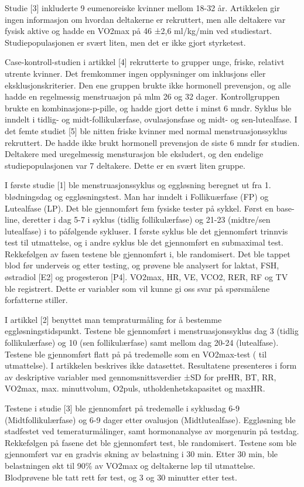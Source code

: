 \documentclass[
  letterpaper,
  DIV=11,
  numbers=noendperiod]{scrreprt}
\begin{document}
Studie {[}3{]} inkluderte 9 eumenoreiske kvinner mellom 18-32 år.
Artikkelen gir ingen informasjon om hvordan deltakerne er rekruttert,
men alle deltakere var fysisk aktive og hadde en VO2max på 46 ±2,6
ml/kg/min ved studiestart. Studiepopulasjonen er svært liten, men det er
ikke gjort styrketest.

Case-kontroll-studien i artikkel {[}4{]} rekrutterte to grupper unge,
friske, relativt utrente kvinner. Det fremkommer ingen opplysninger om
inklusjons eller eksklusjonskriterier. Den ene gruppen brukte ikke
hormonell prevensjon, og alle hadde en regelmessig menstruasjon på mlm
26 og 32 dager. Kontrollgruppen brukte en kombinasjons-p-pille, og hadde
gjort dette i minst 6 mndr. Syklus ble inndelt i tidlig- og
midt-follikulærfase, ovulasjonsfase og midt- og sen-lutealfase. I det
femte studiet {[}5{]} ble nitten friske kvinner med normal
menstruasjonssyklus rekruttert. De hadde ikke brukt hormonell prevensjon
de siste 6 mndr før studien. Deltakere med uregelmessig mensturasjon ble
eksludert, og den endelige studiepopulasjonen var 7 deltakere. Dette er
en svært liten gruppe.

I første studie {[}1{]} ble menstruasjonssyklus og eggløsning beregnet
ut fra 1. blødningsdag og eggløsningstest. Man har inndelt i
Follikuærfase (FP) og Lutealfase (LP). Det ble gjennomført fem fysiske
tester på sykkel. Først en base-line, deretter i dag 5-7 i syklus
(tidlig follikulærfase) og 21-23 (midtre/sen lutealfase) i to påfølgende
sykluser. I første syklus ble det gjennomført trinnvis test til
utmattelse, og i andre syklus ble det gjennomført en submaximal test.
Rekkefølgen av fasen testene ble gjennomført i, ble randomisert. Det ble
tappet blod før underveis og etter testing, og prøvene ble analysert for
laktat, FSH, østradiol {[}E2{]} og progesteron {[}P4{]}. VO2max, HR, VE,
VCO2, RER, RF og TV ble registrert. Dette er variabler som vil kunne gi
oss svar på spørsmålene forfatterne stiller.

I artikkel {[}2{]} benyttet man tempraturmåling for å bestemme
eggløsningstidspunkt. Testene ble gjennomført i menstruasjonssyklus dag
3 (tidlig follikulærfase) og 10 (sen follikulærfase) samt mellom dag
20-24 (lutealfase). Testene ble gjennomført flatt på på tredemølle som
en VO2max-test ( til utmattelse). I artikkelen beskrives ikke
datasettet. Resultatene presenteres i form av deskriptive variabler med
gennomsnittsverdier ±SD for preHR, BT, RR, VO2max, max. minuttvolum,
O2puls, utholdenhetskapasitet og maxHR.

Testene i studie {[}3{]} ble gjennomført på tredemølle i syklusdag 6-9
(Midtfollikulærfase) og 6-9 dager etter ovalusjon (Midtlutealfase).
Eggløsning ble stadfestet ved temeraturmålinger, samt hormonanalyse av
morgenurin på testdag. Rekkefølgen på fasene det ble gjennomført test,
ble randomisert. Testene som ble gjennomført var en gradvis økning av
belastning i 30 min. Etter 30 min, ble belastningen økt til 90\% av
VO2max og deltakerne løp til utmattelse. Blodprøvene ble tatt rett før
test, og 3 og 30 minutter etter test.
\end{document}
